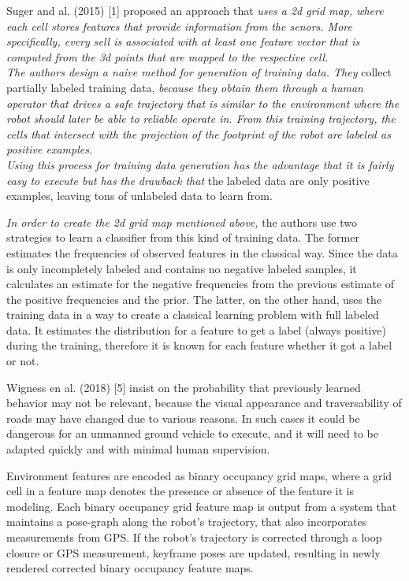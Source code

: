 \documentclass[12pt,a4paper]{article}
\begin{document}
	Suger and al. (2015) [1] proposed an approach that \textit{uses a 2d grid map, where 
	each cell stores features that provide information from the senors. More 
	specifically, every sell is associated with at least one feature vector that is 
	computed from the 3d points that are mapped to the respective cell.
	\\
	The authors design a naive method for generation of training data. They} 
	collect partially labeled training data, \textit{because they obtain them through a 
	human operator that drives a safe trajectory that is similar to the 
	environment where the robot should later be able to reliable operate	in. From this 
	training trajectory, the cells that intersect with the projection of the footprint 
	of the robot are labeled as positive examples. 
	\\
	Using this process for training data generation has the advantage that it 
	is fairly easy to execute but has the drawback that} the labeled data are only 
	positive examples, leaving tons of unlabeled data to learn from.
	
	\textit{In order to create the 2d grid map mentioned above,} the authors use two strategies to learn a classifier from this kind of 
	training data. The former estimates the frequencies of observed	features in the 
	classical way. Since the data is only incompletely labeled and contains no 
	negative labeled samples, it calculates an estimate for the negative 
	frequencies from the previous estimate of the positive frequencies and the prior. The 
	latter, on the other hand, uses the training data in a way to create a classical 
	learning problem with full labeled data. It estimates the distribution for a 
	feature to get a label (always positive) during the training, therefore it is 
	known for each feature whether it got a label or not.
	\newline
	
	Wigness en al. (2018) [5] insist on the probability that previously learned 
	behavior may not be relevant, because the visual appearance and traversability 
	of roads may have changed due to various reasons. In such cases it could be 
	dangerous for an unmanned ground vehicle to execute, and it will need to be 
	adapted quickly and with minimal human supervision.
	
	Environment features are encoded as binary occupancy grid maps, where 
	a grid cell in a feature map denotes the presence or absence of the feature 
	it is modeling. Each binary occupancy grid feature map is output from a 
	system that maintains a pose-graph along the robot’s trajectory, that also 
	incorporates measurements from GPS. If the robot’s trajectory is corrected 
	through a loop closure or GPS measurement, keyframe poses are updated, 
	resulting in newly rendered corrected binary occupancy feature maps.
	
\end{document}

